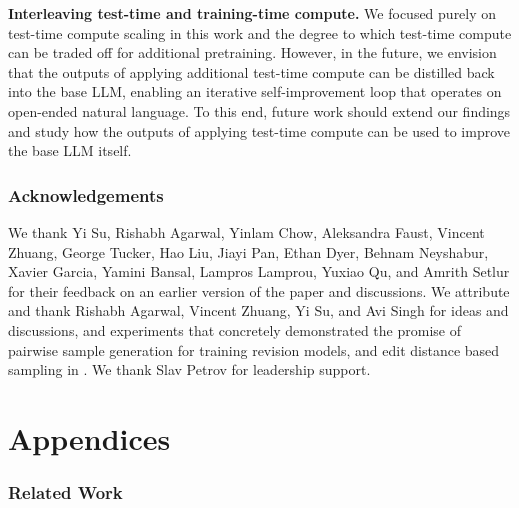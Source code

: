 \documentclass[11pt, letterpaper, logo]{googledeepmind}
\begin{document}
\textbf{Interleaving test-time and training-time compute.} We focused purely on test-time compute scaling in this work and the degree to which test-time compute can be traded off for additional pretraining. However, in the future, we envision that the outputs of applying additional test-time compute can be distilled back into the base LLM, enabling an iterative self-improvement loop that operates on open-ended natural language. To this end, future work should extend our findings and study how the outputs of applying test-time compute can be used to improve the base LLM itself.

\vspace{-0.2cm}
\section*{Acknowledgements}
\vspace{-0.2cm}
We thank Yi Su, Rishabh Agarwal, Yinlam Chow, Aleksandra Faust, Vincent Zhuang, George Tucker, Hao Liu, Jiayi Pan, Ethan Dyer, Behnam Neyshabur, Xavier Garcia, Yamini Bansal, Lampros Lamprou, Yuxiao Qu, and Amrith Setlur for their feedback on an earlier version of the paper and discussions. We attribute and thank Rishabh Agarwal, Vincent Zhuang, Yi Su, and Avi Singh for ideas and discussions, and experiments that concretely demonstrated the promise of pairwise sample generation for training revision models, and edit distance based sampling in \citep{anonymousrevisions}. We thank Slav Petrov for leadership support.



\nobibliography*


\newpage 

\appendix 
\part*{Appendices}

\vspace{-0.2cm}
\section{Related Work}
\vspace{-0.2cm}
\end{document}

